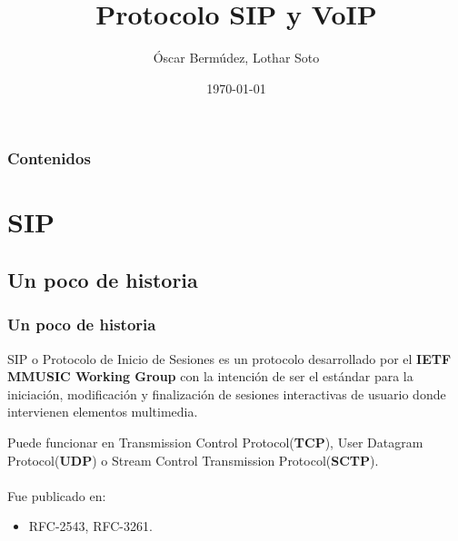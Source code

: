 \documentclass{beamer}
\title[Protocolo SIP y VoIP]{Protocolo SIP y VoIP} %
\author{Óscar Bermúdez, Lothar Soto} %
\institute[UGR] %
{
  Universidad de Granada \\ %
  \medskip
  \textit{lsotpal@correo.ugr.es\\
  oscarbg@correo.ugr.es} %
}
\date{\today} %
\begin{document}
\begin{frame}
\titlepage %
\end{frame}

\begin{frame}
  \frametitle{Contenidos} %
  \tableofcontents
\end{frame}




\section{SIP} %

	\subsection{Un poco de historia} %
	\begin{frame}
	\frametitle{Un poco de historia}
		SIP o Protocolo de Inicio de Sesiones es un protocolo desarrollado por el \textbf{IETF MMUSIC Working Group} con la intención de ser el estándar para la iniciación, modificación y finalización de sesiones interactivas de usuario donde intervienen elementos multimedia.
		
		Puede funcionar en Transmission Control Protocol(\textbf{TCP}), User Datagram Protocol(\textbf{UDP}) o Stream Control Transmission Protocol(\textbf{SCTP}).\\~\\
		Fue publicado en:
		\begin{itemize}
		\item RFC-2543, RFC-3261.
		\end{itemize}
	\end{frame}
	
\end{document}

